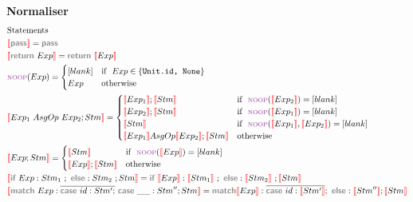 \documentclass[11pt]{jarticle}
\newcommand{\gray}[1]{\textbf{\textsf{\color{Gray}#1}}}
\newcommand{\nl}[1]{{\color{red}{\llbracket}}#1{\color{red}{\rrbracket}}} %
\begin{document}
{\bf Normaliser}
\begin{align*}
  & \text{Statements}\\
  & \nl{\gray{pass}} = \gray{pass}\\
  & \nl{\gray{return}~Exp} = \gray{return} ~ \nl{Exp}\\
  & {\scriptsize{\text{\color{Purple}NOOP}}}(Exp) = 
  \begin{cases}
    [blank] & \text{if}~~ Exp \in \{\texttt{Unit.id, None}\}\\
    Exp & \text{otherwise}
  \end{cases}\\
  & \nl{Exp_1 ~AsgOp~ Exp_2 ; Stm} = 
  \begin{cases}
    \nl{Exp_1} ; \nl{Stm} & \text{if}~~ {\scriptsize{\text{\color{Purple}NOOP}}}(\nl{Exp_2}) = [blank]\\
    \nl{Exp_2} ; \nl{Stm} & \text{if}~~ {\scriptsize{\text{\color{Purple}NOOP}}}(\nl{Exp_1}) = [blank]\\
    \nl{Stm} & \text{if}~~ {\scriptsize{\text{\color{Purple}NOOP}}}(\nl{Exp_1},\nl{Exp_2}) = [blank]\\
    \nl{Exp_1} AsgOp \nl{Exp_2} ; \nl{Stm} & \text{otherwise}
  \end{cases}\\
  & \nl{Exp;Stm} =
  \begin{cases}
    \nl{Stm} & \text{if}~~ {\scriptsize{\text{\color{Purple}NOOP}}}(\nl{Exp}) = [blank]\\
    \nl{Exp} ; \nl{Stm} & \text{otherwise}
  \end{cases}\\
  & \nl{\gray{if}~Exp:Stm_1~;~\gray{else}:Stm_2 ~;Stm} = \gray{if}~\nl{Exp}:\nl{Stm_1}~;~\gray{else}:\nl{Stm_2}~;\nl{Stm}\\
  & \nl{\gray{match}~Exp: \overline{\gray{case}~id:Stm';} ~\gray{case}~\_\_:Stm''; Stm} = \gray{match} \nl{Exp}: \overline{\gray{case}~id: \nl{Stm'}};~ \gray{else}: \nl{Stm''} ; \nl{Stm}
\end{align*}
\end{document}
